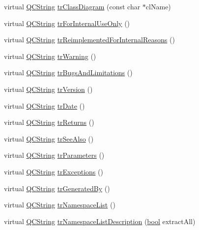 \begin{DoxyCompactItemize}
virtual \hyperlink{class_q_c_string}{Q\+C\+String} \hyperlink{class_translator_norwegian_ac3fdd9c68f86820273ed846947b36a32}{tr\+Class\+Diagram} (const char $\ast$cl\+Name)
\item 
virtual \hyperlink{class_q_c_string}{Q\+C\+String} \hyperlink{class_translator_norwegian_ae24456df4b45e2bd59c72676a8540dd9}{tr\+For\+Internal\+Use\+Only} ()
\item 
virtual \hyperlink{class_q_c_string}{Q\+C\+String} \hyperlink{class_translator_norwegian_ae612ce5aee18c767dbfcece833d81a95}{tr\+Reimplemented\+For\+Internal\+Reasons} ()
\item 
virtual \hyperlink{class_q_c_string}{Q\+C\+String} \hyperlink{class_translator_norwegian_a321a35ac04917c7cfad58c8b07d96c66}{tr\+Warning} ()
\item 
virtual \hyperlink{class_q_c_string}{Q\+C\+String} \hyperlink{class_translator_norwegian_a17a24abd1755843a02c90fb423414769}{tr\+Bugs\+And\+Limitations} ()
\item 
virtual \hyperlink{class_q_c_string}{Q\+C\+String} \hyperlink{class_translator_norwegian_a6204fd86995f2396d07f220646d16880}{tr\+Version} ()
\item 
virtual \hyperlink{class_q_c_string}{Q\+C\+String} \hyperlink{class_translator_norwegian_a5d293c6ae2efe0cfe082d73ebb4806f4}{tr\+Date} ()
\item 
virtual \hyperlink{class_q_c_string}{Q\+C\+String} \hyperlink{class_translator_norwegian_a996a8f2034b0a0e979b5e09edaac9ce2}{tr\+Returns} ()
\item 
virtual \hyperlink{class_q_c_string}{Q\+C\+String} \hyperlink{class_translator_norwegian_ad331eea92a6521513efff980c9a344a2}{tr\+See\+Also} ()
\item 
virtual \hyperlink{class_q_c_string}{Q\+C\+String} \hyperlink{class_translator_norwegian_a6d3b1c8cab7987a61c80ef039cb3e563}{tr\+Parameters} ()
\item 
virtual \hyperlink{class_q_c_string}{Q\+C\+String} \hyperlink{class_translator_norwegian_af7e07ca08e6f39ba175943fca916b7cf}{tr\+Exceptions} ()
\item 
virtual \hyperlink{class_q_c_string}{Q\+C\+String} \hyperlink{class_translator_norwegian_a1f1ff1719d5b3892d666abadeed6ee74}{tr\+Generated\+By} ()
\item 
virtual \hyperlink{class_q_c_string}{Q\+C\+String} \hyperlink{class_translator_norwegian_a112cf9d7c4bf30cf4b08df6f955a147b}{tr\+Namespace\+List} ()
\item 
virtual \hyperlink{class_q_c_string}{Q\+C\+String} \hyperlink{class_translator_norwegian_a6f3d5dc20f9f7dff9c4f7cd0c81c8dab}{tr\+Namespace\+List\+Description} (\hyperlink{qglobal_8h_a1062901a7428fdd9c7f180f5e01ea056}{bool} extract\+All)

\end{DoxyCompactItemize}
